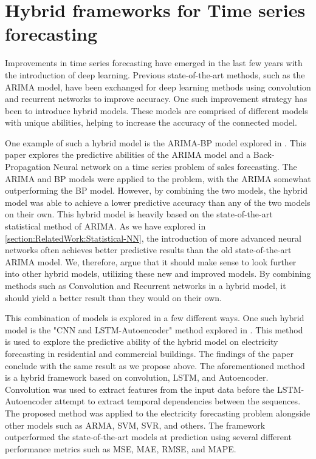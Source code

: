 
\section{Hybrid frameworks for Time series forecasting}
\label{section:RelatedWork:Hybrid}



Improvements in time series forecasting have emerged in the last few years with the introduction of deep learning.
Previous state-of-the-art methods, such as the ARIMA model, have been exchanged for deep learning methods using convolution and recurrent networks to improve accuracy.
One such improvement strategy has been to introduce hybrid models.
These models are comprised of different models with unique abilities, helping to increase the accuracy of the connected model.


One example of such a hybrid model is the ARIMA-BP model explored in \cite{Bowen2020}.
This paper explores the predictive abilities of the ARIMA model and a Back-Propagation Neural network on a time series problem of sales forecasting.
The ARIMA and BP models were applied to the problem, with the ARIMA somewhat outperforming the BP model.
However, by combining the two models, the hybrid model was able to achieve a lower predictive accuracy than any of the two models on their own.
This hybrid model is heavily based on the state-of-the-art statistical method of ARIMA.
As we have explored in \ref{section:RelatedWork:Statistical-NN}, the introduction of more advanced neural networks often achieves better predictive results than the old state-of-the-art ARIMA model.
We, therefore, argue that it should make sense to look further into other hybrid models, utilizing these new and improved models.
By combining methods such as Convolution and Recurrent networks in a hybrid model, it should yield a better result than they would on their own.


This combination of models is explored in a few different ways.
One such hybrid model is the "CNN and LSTM-Autoencoder" method explored in \cite{Khan2020}.
This method is used to explore the predictive ability of the hybrid model on electricity forecasting in residential and commercial buildings.
The findings of the paper conclude with the same result as we propose above.
The aforementioned method is a hybrid framework based on convolution, LSTM, and Autoencoder.
Convolution was used to extract features from the input data before the LSTM-Autoencoder attempt to extract temporal dependencies between the sequences.
The proposed method was applied to the electricity forecasting problem alongside other models such as ARMA, SVM, SVR, and others.
The framework outperformed the state-of-the-art models at prediction using several different performance metrics such as MSE, MAE, RMSE, and MAPE.


